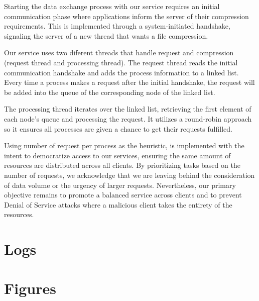 \documentclass[12pt]{article}
\begin{document}
\par Starting the data exchange process with our service requires an initial communication phase where applications inform the server of their compression requirements. This is implemented through a system-initiated handshake, signaling the server of a new thread that wants a file compression.

\par Our service uses two diferent threads that handle request and compression (request thread and processing thread). The request thread reads the initial communication handshake and adds the process information to a linked list. Every time a process makes a request after the initial handshake, the request will be added into the queue of the corresponding node of the linked list. 

\par The processing thread iterates over the linked list, retrieving the first element of each node's queue and processing the request. It utilizes a round-robin approach so it ensures all processes are given a chance to get their requests fulfilled.

\par Using number of request per process as the heuristic, is implemented with the intent to democratize access to our services, ensuring the same amount of resources are distributed across all clients. By prioritizing tasks based on the number of requests, we acknowledge that we are leaving behind the consideration of data volume or the urgency of larger requests. Nevertheless, our primary objective remains to promote a balanced service across clients and to prevent Denial of Service attacks where a malicious client takes the entirety of the resources.
\section*{Logs}



\section*{Figures}
\end{document}

